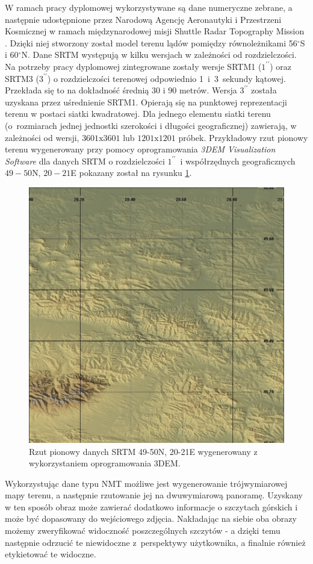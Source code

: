 \par

W ramach pracy dyplomowej wykorzystywane są dane numeryczne zebrane, a następnie udostępnione przez Narodową Agencję Aeronautyki i Przestrzeni Kosmicznej w ramach międzynarodowej misji Shuttle Radar Topography Mission \cite{SRTM}. Dzięki niej stworzony został model terenu lądów pomiędzy równoleżnikami 56$^{\circ}$S i 60$^{\circ}$N. Dane SRTM występują w kilku wersjach w zależności od rozdzielczości. Na potrzeby pracy dyplomowej zintegrowane zostały wersje SRTM1 ($1^{\prime\prime}$) oraz SRTM3 ($3^{\prime\prime}$) o rozdzielczości terenowej odpowiednio 1~i~3~sekundy kątowej. Przekłada się to na dokładność średnią 30 i 90 metrów. Wersja $3^{\prime\prime}$ została uzyskana przez uśrednienie SRTM1. Opierają się na punktowej reprezentacji terenu w postaci siatki kwadratowej. Dla jednego elementu siatki terenu (o~rozmiarach jednej jednostki szerokości i długości geograficznej) zawierają, w zależności od wersji, $3601\textrm{x}3601$ lub $1201\textrm{x}1201$ próbek. Przykładowy rzut pionowy terenu  wygenerowany przy pomocy oprogramowania \textit{3DEM Visualization Software} \cite{3dem} dla danych SRTM o rozdzielczości $1^{\prime\prime}$~i współrzędnych geograficznych $49-50$N, $20-21$E pokazany został na rysunku \ref{fig:srtm-example}.

\begin{figure}[!h]
    \centering \includegraphics[width=0.6\linewidth]{img/srtm_example.jpg}
    \caption{Rzut pionowy danych SRTM 49-50N, 20-21E wygenerowany z wykorzystaniem oprogramowania 3DEM.}
    \label{fig:srtm-example}
\end{figure}

\par

Wykorzystując dane typu NMT możliwe jest wygenerowanie trójwymiarowej mapy terenu, a następnie rzutowanie jej na dwuwymiarową panoramę. Uzyskany w ten sposób obraz może zawierać dodatkowo informacje o szczytach górskich i może być dopasowany do wejściowego zdjęcia. Nakładając na siebie oba obrazy możemy zweryfikować widoczność poszczególnych szczytów - a dzięki temu następnie odrzucić te niewidoczne z~perspektywy użytkownika, a finalnie również etykietować te widoczne.


